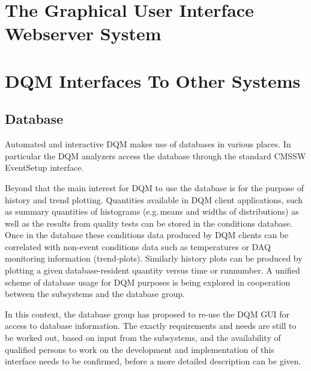 \documentclass[a4paper]{cmspaper}
\begin{document}
\section{The Graphical User Interface Webserver System}
\label{sec:gui}



\section{DQM Interfaces To Other Systems}

\subsection{Database} 
\label{sec:database}

Automated and interactive DQM makes use of databases in various places. In particular
the DQM analyzers access the database through the standard CMSSW EventSetup interface.

Beyond that the main interest for DQM to use the database is for the purpose of
history and trend plotting. Quantities available in DQM client applications, such as summary quantities of histograms (e.g.\,means and widths of distributions) as well as the results from quality tests can be stored in the conditions database. Once in the database these conditions data produced by DQM clients can be correlated with non-event conditions data such as temperatures or DAQ monitoring information (trend-plots). Similarly history plots can be produced by plotting a given database-resident quantity versus time or runnumber.
A unified scheme of database usage for DQM purposes is being explored in cooperation between the subsystems and the database group.

In this context, the database group has proposed to re-use the DQM GUI for access 
to database information. 
The exactly requirements and needs are still to be worked out, based on input
from the subsystems, and the availability of qualified persons to work on the development and implementation of this interface needs to be confirmed, before a more detailed description can be given.
\end{document}
